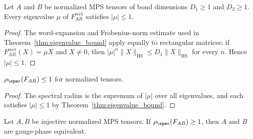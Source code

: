 \begin{theorem}\label{thm:eigenvalue_bound_rect}
    \leanok
    Let $A$ and $B$ be normalized MPS tensors of bond dimensions
    $D_1 \ge 1$ and $D_2 \ge 1$.  Every eigenvalue $\mu$ of
    $F_{AB}^{\mathrm{rect}}$ satisfies $|\mu| \le 1$.
\end{theorem}

\begin{proof}\leanok
    The word-expansion and Frobenius-norm estimate used in
    Theorem~\ref{thm:eigenvalue_bound} apply equally to rectangular matrices:
    if $F_{AB}^{\mathrm{rect}}(X)=\mu X$ and $X\neq 0$, then
    $|\mu|^n\|X\|_{\mathrm{HS}}\le D_1\|X\|_{\mathrm{HS}}$
    for every $n$.  Hence $|\mu|\le 1$.
\end{proof}

\begin{lemma}\label{thm:spectral_radius_le_one}
    \leanok
    $\rho_{\spec}(F_{AB}) \le 1$ for normalized tensors.
\end{lemma}

\begin{proof}\leanok{}
    The spectral radius is the supremum of $|\mu|$ over all
    eigenvalues, and each satisfies $|\mu| \le 1$ by
    Theorem~\ref{thm:eigenvalue_bound}.
\end{proof}

\begin{theorem}%
    \label{thm:modulus_one_gauge}
    \leanok
    Let $A, B$ be injective normalized MPS tensors.
    If $\rho_{\spec}(F_{AB}) \ge 1$, then $A$ and $B$ are
    gauge-phase equivalent.
\end{theorem}

